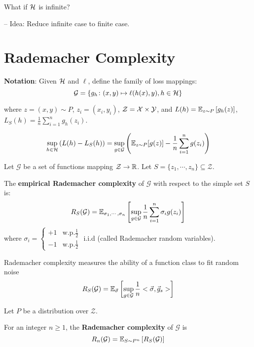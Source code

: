What if \(\mathcal{H}\) is infinite? 

-- Idea: Reduce infinite case to finite case. 


\section{Rademacher Complexity}

\textbf{Notation}: Given \(\mathcal{H}\) and \(\ell\), define the family of loss mappings: 
\[
    \mathcal{G} = \{ g_h \colon (x, y) \mapsto \ell (h(x), y), h \in \mathcal{H} \}
\]

where \(z = (x, y) \sim P\), \(z_i = (x_i, y_i)\), \(\mathcal{Z} = \mathcal{X} \times \mathcal{Y}\), 
and \(L(h) = \mathbb{E}_{z \sim P} \left[ g_h(z) \right]\), \(L_S(h) = \frac{1}{n} \sum_{i=1}^n g_h(z_i)\). 

\[
    \sup_{h \in \mathcal{H}} \left(L(h) - L_S(h)\right) = \sup_{g \in \mathcal{G}} \left(
        \mathbb{E}_{z \sim P} [g(z)] - \frac{1}{n} \sum_{i=1}^n g(z_i)
    \right)    
\]


\begin{definition}
    Let \(\mathcal{G}\) be a set of functions mapping \(\mathcal{Z} \to \mathbb{R}\). 
    Let \(S = \{z_1, \cdots, z_n\} \subseteq \mathcal{Z}\). 

    The \textbf{empirical Rademacher complexity} of \(\mathcal{G}\) with respect to the simple 
    set \(S\) is: 
    \[
        R_S(\mathcal{G}) = \mathbb{E}_{\sigma_1, \cdots, \sigma_n} \left[ \sup_{g \in \mathcal{G}} \frac{1}{n} \sum_{i=1}^n \sigma_i g(z_i) \right]  
    \]
    where \(\sigma_i = \begin{cases}
        +1 & \text{w.p.} \frac{1}{2} \\ 
        -1 & \text{w.p.} \frac{1}{2}
    \end{cases}\) i.i.d (called Rademacher random variables). 
\end{definition}


\begin{remark}
    Rademacher complexity measures the ability of a function class to fit random noise 
    \[
        R_S(\mathcal{G}) = \mathbb{E}_{\vec{\sigma}} \left[ \sup_{g \in \mathcal{G}} \frac{1}{n} <\vec{\sigma}, \vec{g}_s> \right]  
    \]
\end{remark}


\begin{definition}
    Let \(P\) be a distribution over \(\mathcal{Z}\). 
    
    For an integer \(n \geq 1\), the \textbf{Rademacher complexity} of \(\mathcal{G}\) is 
    \[
        R_n(\mathcal{G}) = \mathbb{E}_{S \sim P^n} \left[ R_S(\mathcal{G}) \right]  
    \]
\end{definition}


